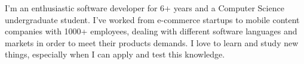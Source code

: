 %
%
%

\par{
	I'm an enthusiastic software developer for 6+ years and a Computer Science undergraduate student. I've worked from e-commerce startups to mobile content companies with 1000+ employees, dealing with different software languages and markets in order to meet their products demands. I love to learn and study new things, especially when I can apply and test this knowledge.
}